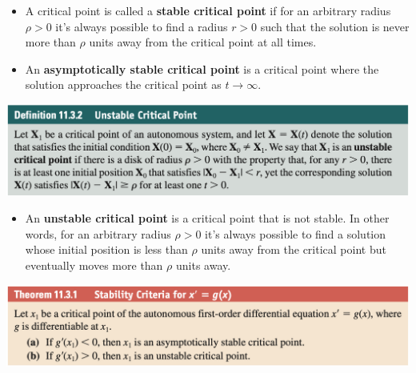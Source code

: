 \documentclass{article}
\begin{document}
\begin{itemize}
  \item A critical point is called a \textbf{stable critical point} if for an arbitrary radius $\rho > 0$ it's always possible to find a radius $r > 0$ such that the solution is never more than $\rho$ units away from the critical point at all times.

  \item An \textbf{asymptotically stable critical point} is a critical point where the solution approaches the critical point as $t \rightarrow \infty$.
\end{itemize}

\noindent
\includegraphics[scale=0.47]{unstable-critical-points}

\begin{itemize}
  \item An \textbf{unstable critical point} is a critical point that is not stable. In other words, for an arbitrary radius $\rho > 0$ it's always possible to find a solution whose initial position is less than $\rho$ units away from the critical point but eventually moves more than $\rho$ units away.
\end{itemize}

\noindent
\includegraphics[scale=0.47]{stability-criteria-for-odes}
\end{document}
